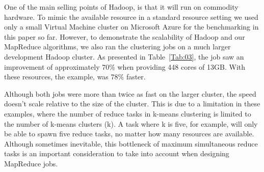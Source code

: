 \documentclass{bioinfo}
\begin{document}
One of the main selling points of Hadoop, is that it will run on commodity hardware. 
To mimic the available resource in a standard resource setting we used only a small Virtual Machine cluster on Microsoft Azure for the benchmarking in this paper so far.
However, to demonstrate the scalability of Hadoop and our MapReduce algorithms, we also ran the clustering jobs on a much larger development Hadoop cluster. 
As presented in Table~\ref{Tab:03}, the \OnePhaseone{} job saw an improvement of approximately 70\% when providing 448 cores of 13GB. 
With these resources, the \FullPhasethree{} example, was 78\% faster.

Although both jobs were more than twice as fast on the larger cluster, the speed doesn't scale relative to the size of the cluster. This is due to a limitation in these examples, where the number of reduce tasks in k-means clustering is limited to the number of k-means clusters (k).
A task where k is five, for example, will only be able to spawn five reduce tasks, no matter how many resources are available. Although sometimes inevitable, this bottleneck of maximum simultaneous reduce tasks is an important consideration to take into account when designing MapReduce jobs. 
\end{document}
